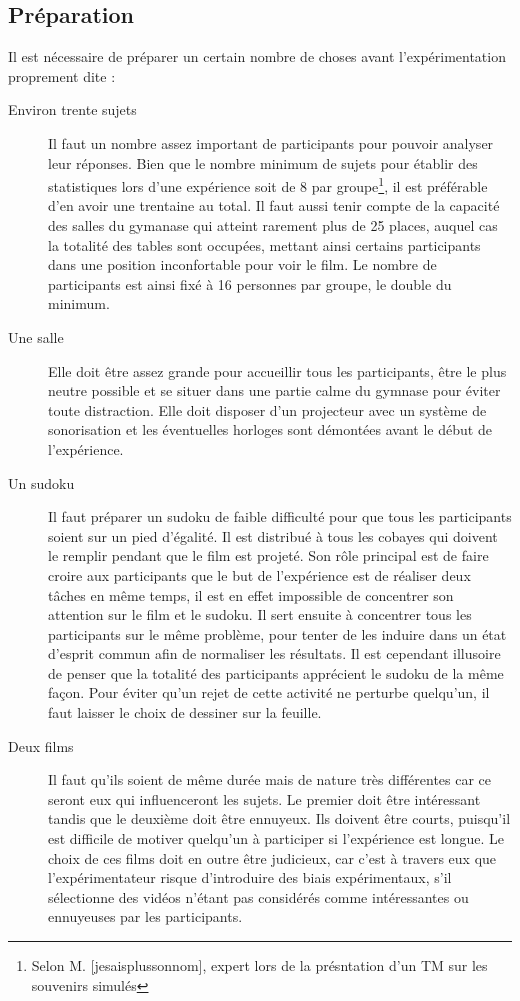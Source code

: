 \documentclass[12pt,fleqn,oneside,openany,]{book} %
\begin{document}
\subsection{Préparation} \label{ssec:preparation}
Il est nécessaire de préparer un certain nombre de choses avant l'expérimentation proprement dite :

\begin{description}
	\item[Environ trente sujets] Il faut un nombre assez important de participants pour pouvoir analyser leur réponses. Bien que le nombre minimum de sujets pour établir des statistiques lors d'une expérience soit de 8 par groupe\footnote{Selon M. [jesaisplussonnom], expert lors de la présntation d'un TM sur les souvenirs simulés}, il est préférable d'en avoir une trentaine au total. Il faut aussi tenir compte de la capacité des salles du gymanase qui atteint rarement plus de 25 places, auquel cas la totalité des tables sont occupées, mettant ainsi certains participants dans une position inconfortable pour voir le film. Le nombre de participants est ainsi fixé à 16 personnes par groupe, le double du minimum.
	\item[Une salle] Elle doit être assez grande pour accueillir tous les participants, être le plus neutre possible et se situer dans une partie calme du gymnase pour éviter toute distraction. Elle doit disposer d'un projecteur avec un système de sonorisation et les éventuelles horloges sont démontées avant le début de l'expérience.
	\item[Un sudoku] Il faut préparer un sudoku de faible difficulté pour que tous les participants soient sur un pied d'égalité. Il est distribué à tous les cobayes qui doivent le remplir pendant que le film est projeté. Son rôle principal est de faire croire aux participants que le but de l'expérience est de réaliser deux tâches en même temps, il est en effet impossible de concentrer son attention sur le film et le sudoku. Il sert ensuite à concentrer tous les participants sur le même problème, pour tenter de les induire dans un état d'esprit commun afin de normaliser les résultats. Il est cependant illusoire de penser que la totalité des participants apprécient le sudoku de la même façon. Pour éviter qu'un rejet de cette activité ne perturbe quelqu'un, il faut laisser le choix de dessiner sur la feuille.
	\item[Deux films] Il faut qu'ils soient de même durée mais de nature très différentes car ce seront eux qui influenceront les sujets. Le premier doit être intéressant tandis que le deuxième doit être ennuyeux. Ils doivent être courts, puisqu'il est difficile de motiver quelqu'un à participer si l'expérience est longue. Le choix de ces films doit en outre être judicieux, car c'est à travers eux que l'expérimentateur risque d'introduire des biais expérimentaux, s'il sélectionne des vidéos n'étant pas considérés comme intéressantes ou ennuyeuses par les participants. 


\end{description}
\end{document}
